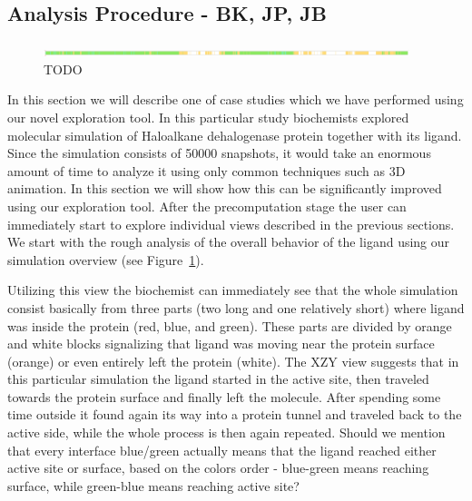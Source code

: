 \documentclass[twocolumn]{bmcart}%
\begin{document}
\subsection*{Analysis Procedure - BK, JP, JB}

\begin{figure}[htb]
	\centering
  \includegraphics[width=0.95\textwidth]{img/case_overview.png}
  \caption{\label{fig:case_overview} {\color{red}TODO}}
\end{figure}

In this section we will describe one of case studies which we have performed using our novel exploration tool.
In this particular study biochemists explored molecular simulation of Haloalkane dehalogenase protein together with its ligand. 
Since the simulation consists of 50000 snapshots, it would take an enormous amount of time to analyze it using only common techniques such as 3D animation.
In this section we will show how this can be significantly improved using our exploration tool.
After the precomputation stage the user can immediately start to explore individual views described in the previous sections.
We start with the rough analysis of the overall behavior of the ligand using our simulation overview (see Figure~\ref{fig:case_overview}).


Utilizing this view the biochemist can immediately see that the whole simulation consist basically from three parts (two long and one relatively short) where ligand was inside the protein (red, blue, and green).
These parts are divided by orange and white blocks signalizing that ligand was moving near the protein surface (orange) or even entirely left the protein (white). 
The {\color{red}XZY}  view suggests that in this particular simulation the ligand started in the active site, then traveled towards the protein surface and finally left the molecule.
After spending some time outside it found again its way into a protein tunnel and traveled back to the active side, while the whole process is then again repeated. 
{\color{red}Should we mention that every interface blue/green actually means that the ligand reached either active site or surface, based on the colors order - blue-green means reaching surface, while green-blue means reaching active site?} 
\end{document}
